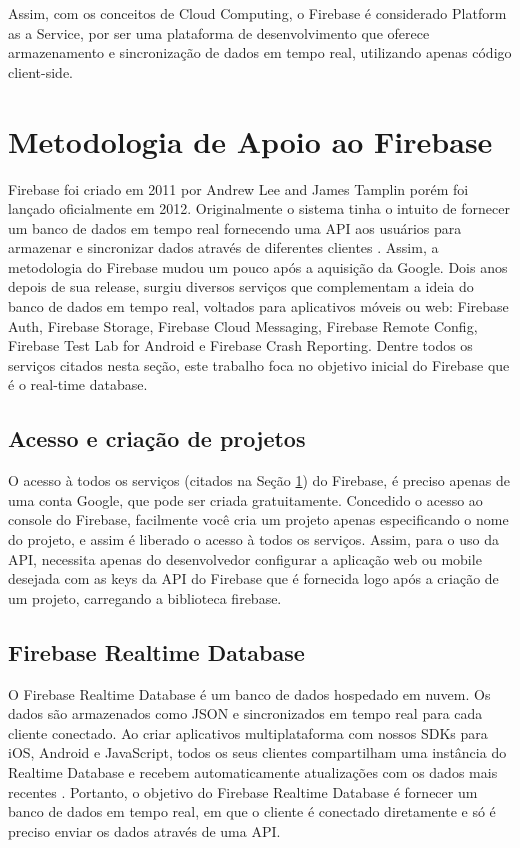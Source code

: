 \documentclass[12pt]{article}
\begin{document}
Assim, com os conceitos de Cloud Computing, o Firebase é considerado Platform as a Service, por ser uma plataforma de desenvolvimento que oferece armazenamento e sincronização de dados em tempo real, utilizando apenas código client-side. 

\section{Metodologia de Apoio ao Firebase}  \label{sec:metodologia}

Firebase foi criado em 2011 por Andrew Lee and James Tamplin porém foi lançado oficialmente em 2012. Originalmente o sistema tinha o intuito de fornecer um banco de dados em tempo real fornecendo uma API aos usuários para armazenar e sincronizar dados através de diferentes clientes \cite{3}. Assim, a metodologia do Firebase mudou um pouco após a aquisição da Google. Dois anos depois de sua release, surgiu diversos serviços que complementam a ideia do banco de dados em tempo real, voltados para aplicativos móveis ou web: Firebase Auth, Firebase Storage, Firebase Cloud Messaging, Firebase Remote Config, Firebase Test Lab for Android e Firebase Crash Reporting. Dentre todos os serviços citados nesta seção, este trabalho foca no objetivo inicial do Firebase que é o real-time database.

\subsection{Acesso e criação de projetos}

O acesso à todos os serviços (citados na Seção \ref{sec:metodologia}) do Firebase, é preciso apenas de uma conta Google, que pode ser criada gratuitamente. Concedido o acesso ao console do Firebase, facilmente você cria um projeto apenas especificando o nome do projeto, e assim é liberado o acesso à todos os serviços. Assim, para o uso da API, necessita apenas do desenvolvedor configurar a aplicação web ou mobile desejada com as keys da API do Firebase que é fornecida logo após a criação de um projeto, carregando a biblioteca firebase.

\subsection{Firebase Realtime Database}

O Firebase Realtime Database é um banco de dados hospedado em nuvem. Os dados são armazenados como JSON e sincronizados em tempo real para cada cliente conectado. Ao criar aplicativos multiplataforma com nossos SDKs para iOS, Android e JavaScript, todos os seus clientes compartilham uma instância do Realtime Database e recebem automaticamente atualizações com os dados mais recentes \cite{Firebase}. Portanto, o objetivo do Firebase Realtime Database é fornecer um banco de dados em tempo real, em que o cliente é conectado diretamente e só  é preciso enviar os dados através de uma API.
\end{document}
